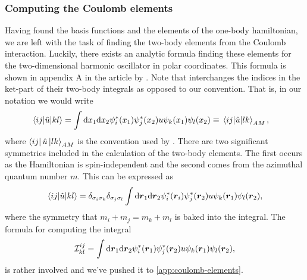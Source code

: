         \subsubsection{Computing the Coulomb elements}
            Having found the basis functions and the elements of the one-body
            hamiltonian, we are left with the task of finding the two-body
            elements from the Coulomb interaction.
            Luckily, there exists an analytic formula finding these elements for
            the two-dimensional harmonic oscillator in polar coordinates.
            This formula is shown in appendix A in the article
             by
            \citeauthor{anisimovas1998energy} \cite{anisimovas1998energy}.
            Note that \citeauthor{anisimovas1998energy} interchanges the indices
            in the ket-part of their two-body integrals as opposed to our
            convention. That is, in our notation we would write
            \begin{align}
                \mel{ij}{\hat{u}}{kl}
                &=
                \int\dd x_1\dd x_2
                \psi_{i}^{*}(x_1) \psi_{j}^{*}(x_2)
                u
                \psi_{k}(x_1)\psi_{l}(x_2)
                \equiv
                \mel{ij}{\hat{u}}{lk}_{AM},
            \end{align}
            where $ \bra{ij}\hat{u}\ket{lk}_{AM}$ is the convention used by
            \citeauthor{anisimovas1998energy}.
            There are two significant symmetries included in the calculation of
            the two-body elements.
            The first occurs as the Hamiltonian is spin-independent and the
            second comes from the azimuthal quantum number $m$.
            This can be expressed as
            \begin{align}
                \mel{ij}{\hat{u}}{kl}
                = \delta_{\sigma_i \sigma_k} \delta_{\sigma_j \sigma_l}
                \int\dd \boldsymbol{r}_1\dd \boldsymbol{r}_2
                \psi_{i}^{*}(\boldsymbol{r}_i) \psi_{j}^{*}(\boldsymbol{r}_2)
                u
                \psi_{k}(\boldsymbol{r}_1)\psi_{l}(\boldsymbol{r}_2),
            \end{align}
            where the symmetry that $m_i + m_j = m_k + m_l$ is baked into the
            integral.
            The formula for computing the integral
            \begin{align}
                \mathcal{I}^{ij}_{kl}
                =
                \int\dd \boldsymbol{r}_1\dd \boldsymbol{r}_2
                \psi_{i}^{*}(\boldsymbol{r}_1) \psi_{j}^{*}(\boldsymbol{r}_2)
                u
                \psi_{k}(\boldsymbol{r}_1)\psi_{l}(\boldsymbol{r}_2),
            \end{align}
            is rather involved and we've pushed it to
            \autoref{app:coulomb-elements}.


